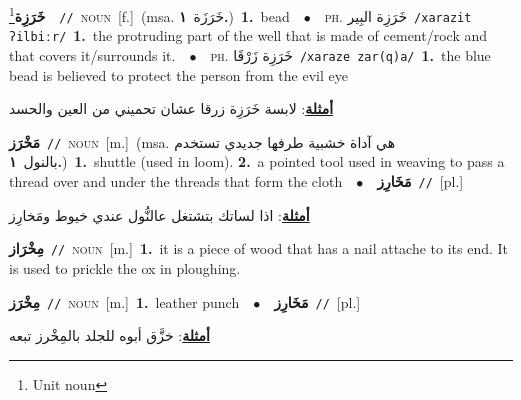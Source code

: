 \documentclass[10pt,a4paper,twoside]{article} %
\begin{document}
\begin{multicols}{2}
{\setlength\topsep{0pt}\textbf{\foreignlanguage{arabic}{خَرَزِة}}\footnote{Unit noun}\ \ {\color{gray}\texttt{//}\color{black}}\ \textsc{noun}\ [f.]\ \color{gray}(msa. \foreignlanguage{arabic}{خَرَزَة}~\foreignlanguage{arabic}{\textbf{١.}})\color{black}\ \textbf{1.}~bead\ \ $\bullet$\ \ \textsc{ph.} \color{gray} \foreignlanguage{arabic}{خَرَزِة البِير}\color{black}\ {\color{gray}\texttt{/{\sffamily xarazit ʔilbiːr}/}\color{black}}\ \textbf{1.}~the protruding part of the well that is made of cement/rock and that covers it/surrounds it.\ \ $\bullet$\ \ \textsc{ph.} \color{gray} \foreignlanguage{arabic}{خَرَزِة زَرْقَا}\color{black}\ {\color{gray}\texttt{/{\sffamily xaraze zar(q)a}/}\color{black}}\ \textbf{1.}~the blue bead is believed to protect the person from the evil eye\  \begin{flushright}\color{gray}\foreignlanguage{arabic}{\textbf{\underline{\foreignlanguage{arabic}{أمثلة}}}: لابسة خَرَزِة زرقا عشان تحميني من العين والحسد}\end{flushright}\color{black}} \vspace{2mm}

{\setlength\topsep{0pt}\textbf{\foreignlanguage{arabic}{مَخْرَز}}\ {\color{gray}\texttt{//}\color{black}}\ \textsc{noun}\ [m.]\ \color{gray}(msa. \foreignlanguage{arabic}{هي آداة خشبية طرفها جديدي تستخدم بالنول}~\foreignlanguage{arabic}{\textbf{١.}})\color{black}\ \textbf{1.}~shuttle (used in loom).  \textbf{2.}~a pointed tool used in weaving to pass a thread over and under the threads that form the cloth\ \ $\bullet$\ \ \setlength\topsep{0pt}\textbf{\foreignlanguage{arabic}{مَخَارِز}}\ {\color{gray}\texttt{//}\color{black}}\ [pl.]\  \begin{flushright}\color{gray}\foreignlanguage{arabic}{\textbf{\underline{\foreignlanguage{arabic}{أمثلة}}}: اذا لساتك بتشتغل عالنُّول عندي خيوط ومَخارِز}\end{flushright}\color{black}} \vspace{2mm}

{\setlength\topsep{0pt}\textbf{\foreignlanguage{arabic}{مِخْرَاز}}\ {\color{gray}\texttt{//}\color{black}}\ \textsc{noun}\ [m.]\ \textbf{1.}~it is a piece of wood that has a nail attache to its end. It is used to prickle the ox in ploughing.\ } \vspace{2mm}

{\setlength\topsep{0pt}\textbf{\foreignlanguage{arabic}{مِخْرَز}}\ {\color{gray}\texttt{//}\color{black}}\ \textsc{noun}\ [m.]\ \textbf{1.}~leather punch\ \ $\bullet$\ \ \setlength\topsep{0pt}\textbf{\foreignlanguage{arabic}{مَخَارِز}}\ {\color{gray}\texttt{//}\color{black}}\ [pl.]\  \begin{flushright}\color{gray}\foreignlanguage{arabic}{\textbf{\underline{\foreignlanguage{arabic}{أمثلة}}}: خزَّق أبوه للجلد بالمِخْرز تبعه}\end{flushright}\color{black}} \vspace{2mm}


\end{multicols}
\end{document}
